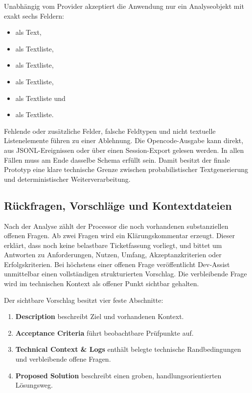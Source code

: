 Unabhängig vom Provider akzeptiert die Anwendung nur ein Analyseobjekt mit exakt sechs Feldern:

\begin{itemize}[leftmargin=0.8cm]
\item {} als Text,
\item {} als Textliste,
\item {} als Textliste,
\item {} als Textliste,
\item {} als Textliste und
\item {} als Textliste.
\end{itemize}

Fehlende oder zusätzliche Felder, falsche Feldtypen und nicht textuelle Listenelemente führen zu einer Ablehnung. Die Opencode-Ausgabe kann direkt, aus JSONL-Ereignissen oder über einen Session-Export gelesen werden. In allen Fällen muss am Ende dasselbe Schema erfüllt sein. Damit besitzt der finale Prototyp eine klare technische Grenze zwischen probabilistischer Textgenerierung und deterministischer Weiterverarbeitung.

\subsection{Rückfragen, Vorschläge und Kontextdateien}

Nach der Analyse zählt der Processor die noch vorhandenen substanziellen offenen Fragen. Ab zwei Fragen wird ein Klärungskommentar erzeugt. Dieser erklärt, dass noch keine belastbare Ticketfassung vorliegt, und bittet um Antworten zu Anforderungen, Nutzen, Umfang, Akzeptanzkriterien oder Erfolgskriterien. Bei höchstens einer offenen Frage veröffentlicht Dev-Assist unmittelbar einen vollständigen strukturierten Vorschlag. Die verbleibende Frage wird im technischen Kontext als offener Punkt sichtbar gehalten.

Der sichtbare Vorschlag besitzt vier feste Abschnitte:

\begin{enumerate}[leftmargin=1.2cm]
\item \textbf{Description} beschreibt Ziel und vorhandenen Kontext.
\item \textbf{Acceptance Criteria} führt beobachtbare Prüfpunkte auf.
\item \textbf{Technical Context \& Logs} enthält belegte technische Randbedingungen und verbleibende offene Fragen.
\item \textbf{Proposed Solution} beschreibt einen groben, handlungsorientierten Lösungsweg.
\end{enumerate}

